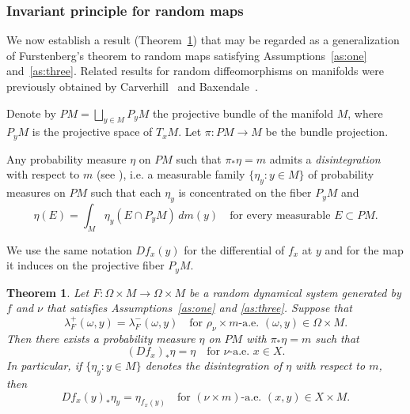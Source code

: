 \documentclass[a4paper,12pt,reqno]{amsart}
\numberwithin{equation}{section}
\newtheorem{theorem}{Theorem}[section]
\begin{document}
\subsubsection{Invariant principle for random maps}

We now establish a result (Theorem~\ref{thm:G}) that may be regarded as a generalization of Furstenberg’s theorem to random maps satisfying Assumptions~\ref{as:one} and~\ref{as:three}. Related results for random diffeomorphisms on manifolds were previously obtained by Carverhill~\cite{carverhill1987furstenberg} and Baxendale~\cite{Baxendale:1989aa}.

Denote by $PM = \bigsqcup_{y \in M} P_yM$ the projective bundle of the manifold $M$, where $P_yM$ is the projective space of $T_xM$. Let $\pi \colon PM \to M$ be the bundle projection. 

Any probability measure $\eta$ on $PM$ such that $\pi_* \eta = m$ admits a \emph{disintegration} with respect to $m$ (see \cite{Viana:2014uo}), i.e. a measurable family $\{\eta_y \colon y \in M\}$ of probability measures on $PM$ such that each $\eta_y$ is concentrated on the fiber $P_yM $ and   
\[
\eta(E) = \int_M \eta_y(E \cap P_y M) \, dm(y) \quad \text{for every measurable } E \subset PM.
\]  

We use the same notation $Df_x(y)$ for the differential of $f_x$ at $y$ and for the map it induces on the projective fiber $P_yM$.


\begin{theorem}
\label{thm:G}
Let $F \colon \Omega \times M \to \Omega \times M$ be a random dynamical system generated by $f$ and $\nu$ that satisfies Assumptions~\ref{as:one} and \ref{as:three}. Suppose that
\[
\lambda^+_F(\omega,y)=\lambda^-_F(\omega,y) \quad \text{for } \rho_\nu \times m \text{-a.e. } (\omega,y) \in \Omega \times M.
\] 
Then there exists a probability measure $\eta$ on $PM$ with $\pi_* \eta = m$ such that 
\[
(Df_x)_* \eta = \eta \quad \text{for } \nu \text{-a.e. } x \in X.
\]
In particular, if $\{\eta_y : y \in M\}$ denotes the disintegration of $\eta$ with respect to $m$, then 
\[
Df_x
(y)_* \eta_y = \eta_{f_x(y)} \quad \text{for } (\nu \times m) \text{-a.e. } (x,y) \in X \times M.
\]
\end{theorem}
\end{document}
